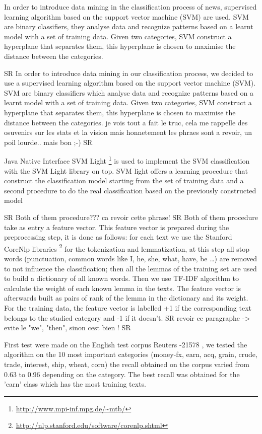 \documentclass{llncs}
\begin{document}
In order to introduce data mining in the classification process of news, supervised learning algorithm based on the support vector machine (SVM) are used. SVM are binary classifiers, they analyse data and recognize patterns based on a learnt model with a set of training data. Given two categories, SVM construct a hyperplane that separates them, this hyperplane is chosen to maximise the distance between the categories.

SR In order to introduce data mining in our classification process, we decided to use a supervised learning algorithm based on the support vector machine (SVM). SVM are binary classifiers which analyse data and recognize patterns based on a learnt model with a set of training data. Given two categories, SVM construct a hyperplane that separates them, this hyperplane is chosen to maximise the distance between the categories.
je vois tout a fait le truc, cela me rappelle des osuvenirs sur les stats et la vision mais honnetement les phraes sont a revoir, un poil lourde.. mais bon ;-) SR

Java Native Interface SVM Light \footnote{\url{http://www.mpi-inf.mpg.de/~mtb/}} is used to implement the SVM classification with the SVM Light library \cite{joachim:svmlight} on top. SVM light offers a learning procedure that construct the classification model starting from the set of training data and a second procedure to do the real classification based on the previously constructed model

SR Both of them procedure??? ca revoir cette phrase! SR
Both of them procedure take as entry a feature vector. This feature vector is prepared during the preprocessing step, it is done as follows: for each text we use the Stanford CoreNlp libraries \footnote{\url{http://nlp.stanford.edu/software/corenlp.shtml}} for the tokenization and lemmatization, at this step all stop words (punctuation, common words like I, he, she, what, have, be …) are removed to not influence the classification; then all the lemmas of the training set are used to build a dictionary of all known words. Then we use TF-IDF algorithm to calculate the weight of each known lemma in the texts. The feature vector is afterwards built as pairs of rank of the lemma in the dictionary and its weight. For the training data, the feature vector is labelled +1 if the corresponding text belongs to the studied category and -1 if it doesn't.
SR revoir ce paragraphe -> evite le "we", "then", sinon cest bien ! SR

First test were made on the English test corpus Reuters -21578 \cite{lewis:reuters}, we tested the algorithm on the 10 most important categories (money-fx, earn, acq, grain, crude, trade, interest, ship, wheat, corn) the recall obtained on the corpus varied from 0.63 to 0.96 depending on the category. The best recall was obtained for the 'earn' class which has the most training texts.
\end{document}

